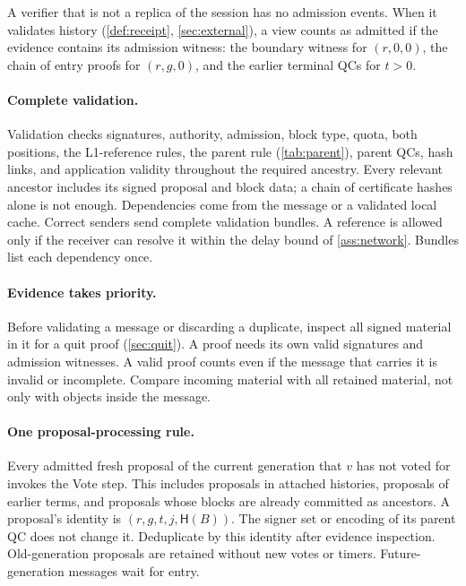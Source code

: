 \documentclass[11pt,a4paper]{article}
\newif\ifrevmarks
\newcommand{\Rv}[1]{\ifrevmarks\leavevmode{\color{rvBlue}#1}\else#1\fi}
\newcommand{\Cid}[1]{\ifrevmarks\textsuperscript{\hyperlink{chg:#1}{\color{rvBlue}\sffamily\scriptsize#1}}\fi}
\newcommand{\Hash}{\mathsf H}
\begin{document}
\Rv{A verifier that is not a replica of the session has no
admission events. When it validates history (\cref{def:receipt},
\cref{sec:external}), a view counts as admitted if the evidence contains
its admission witness: the boundary witness for $(r,0,0)$, the chain of
entry proofs for $(r,g,0)$, and the earlier terminal QCs for $t>0$.}

\paragraph{Complete validation.}
Validation checks signatures, authority, admission, block type, quota,
both positions, the L1-reference rules, the parent rule
(\cref{tab:parent}), parent QCs, hash links, and application validity
throughout the required ancestry. Every relevant ancestor includes its
signed proposal and block data; a chain of certificate hashes alone is
not enough. Dependencies come from the message or a validated local
cache. Correct senders send complete validation bundles. A reference is
allowed only if the receiver can resolve it within the delay bound of
\cref{ass:network}. Bundles list each dependency once.

\paragraph{Evidence takes priority.}
Before validating a message or discarding a duplicate, inspect all signed
material in it for a quit proof (\cref{sec:quit}). A proof needs its own
valid signatures and admission witnesses. A valid proof counts even if
the message that carries it is invalid or incomplete. Compare incoming
material with all retained material, not only with objects inside the
message.

\paragraph{One proposal-processing rule.}
Every admitted fresh proposal of the current generation that $v$ has not
voted for invokes the Vote step. This includes proposals in attached
histories, proposals of earlier terms, and proposals whose blocks are
already committed as ancestors. A proposal's identity is
$(r,g,t,j,\Hash(B))$. The signer set or encoding of its parent QC does
not change it. Deduplicate by this identity after evidence inspection.
Old-generation proposals are retained without new votes or timers.
Future-generation messages wait for entry.
\end{document}
